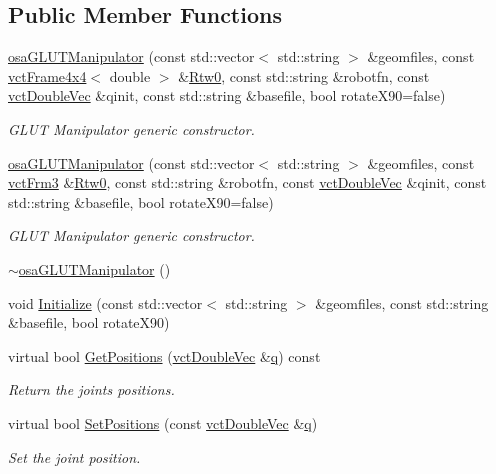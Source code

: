 \subsection*{Public Member Functions}
\begin{DoxyCompactItemize}
\item 
\hyperlink{classosa_g_l_u_t_manipulator_a5789dc8cc50d56e9fdf515bb56a7267a}{osa\+G\+L\+U\+T\+Manipulator} (const std\+::vector$<$ std\+::string $>$ \&geomfiles, const \hyperlink{classvct_frame4x4}{vct\+Frame4x4}$<$ double $>$ \&\hyperlink{classrob_manipulator_ab48d9d9a166bf252698bc35788ca6ad6}{Rtw0}, const std\+::string \&robotfn, const \hyperlink{vct_dynamic_vector_types_8h_ade4b3068c86fb88f41af2e5187e491c2}{vct\+Double\+Vec} \&qinit, const std\+::string \&basefile, bool rotate\+X90=false)
\begin{DoxyCompactList}\small\item\em G\+L\+U\+T Manipulator generic constructor. \end{DoxyCompactList}\item 
\hyperlink{classosa_g_l_u_t_manipulator_acee9eac89fd7f17ed04c3b4eaa77186b}{osa\+G\+L\+U\+T\+Manipulator} (const std\+::vector$<$ std\+::string $>$ \&geomfiles, const \hyperlink{vct_transformation_types_8h_a81feda0a02c2d1bc26e5553f409fed20}{vct\+Frm3} \&\hyperlink{classrob_manipulator_ab48d9d9a166bf252698bc35788ca6ad6}{Rtw0}, const std\+::string \&robotfn, const \hyperlink{vct_dynamic_vector_types_8h_ade4b3068c86fb88f41af2e5187e491c2}{vct\+Double\+Vec} \&qinit, const std\+::string \&basefile, bool rotate\+X90=false)
\begin{DoxyCompactList}\small\item\em G\+L\+U\+T Manipulator generic constructor. \end{DoxyCompactList}\item 
\hyperlink{classosa_g_l_u_t_manipulator_a59a1dcf9af4835767f8f4d162c6d5f49}{$\sim$osa\+G\+L\+U\+T\+Manipulator} ()
\item 
void \hyperlink{classosa_g_l_u_t_manipulator_a430da0b6621741e41f396bb0910988ba}{Initialize} (const std\+::vector$<$ std\+::string $>$ \&geomfiles, const std\+::string \&basefile, bool rotate\+X90)
\item 
virtual bool \hyperlink{classosa_g_l_u_t_manipulator_a7ac591a4bd3a3c85ca6e69f8c24af9b6}{Get\+Positions} (\hyperlink{vct_dynamic_vector_types_8h_ade4b3068c86fb88f41af2e5187e491c2}{vct\+Double\+Vec} \&\hyperlink{classosa_g_l_u_t_manipulator_aaa03cdd6825dd64f23586ab753579ffa}{q}) const 
\begin{DoxyCompactList}\small\item\em Return the joints positions. \end{DoxyCompactList}\item 
virtual bool \hyperlink{classosa_g_l_u_t_manipulator_aab0829d6d76165db89b2d8e0d50d5a4d}{Set\+Positions} (const \hyperlink{vct_dynamic_vector_types_8h_ade4b3068c86fb88f41af2e5187e491c2}{vct\+Double\+Vec} \&\hyperlink{classosa_g_l_u_t_manipulator_aaa03cdd6825dd64f23586ab753579ffa}{q})
\begin{DoxyCompactList}\small\item\em Set the joint position. \end{DoxyCompactList}\end{DoxyCompactItemize}
